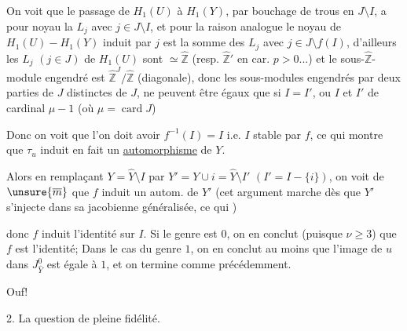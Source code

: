 On voit que le passage de $H_1(U)$ à $H_1(Y)$, par bouchage de trous en $J\setminus I$, a pour noyau la  $L_j$ avec $j\in J\setminus I$, et pour la raison analogue le noyau de $H_1(U)-H_1(Y)$ induit par $j$ est la somme des $L_j$ avec $j\in J\setminus f(I)$, d'ailleurs les $L_j$ $(j\in J)$ de $H_1(U)$ sont $\simeq\widehat{\mathbb Z}$ (resp. $\widehat{\mathbb Z}'$ en car. $p>0$...) et le sous-$\widehat{\mathbb Z}$-module engendré est $\widehat{\mathbb Z}^{J}/\widehat{\mathbb Z}$ (diagonale), donc  les sous-modules engendrés par deux parties  de $J$ distinctes de $J$, ne peuvent être égaux que si $I=I'$, ou $I$ et $I'$ de cardinal $\mu-1$ (où $\mu=\operatorname{card}J$)



 Donc on voit que l'on doit avoir $f^{-1}(I)=I$ i.e. $I$ stable par $f$, ce qui montre que $\tau_u$ induit en fait un \uline{automorphisme} de $Y$.


Alors en remplaçant $Y=\widehat Y\setminus I$ par $Y'=Y\cup i=\widehat Y\setminus I'$ $(I'=I-\{i\})$, on voit de $\unsure{\overline m}$ que $f$ induit un autom. de $Y'$ (cet argument marche dès que $Y'$ s'injecte dans sa jacobienne généralisée, ce qui  )

 donc $f$ induit l'identité sur $I$. Si le genre est $0$, on en conclut (puisque $\nu\geq3$) que $f$ est l'identité;  Dans le cas du genre $1$, on en conclut au moins que l'image de $u$ dans $J_{\widehat Y}^0$ est égale à $1$, et on termine comme précédemment.

Ouf!

2. La question de pleine fidélité.

